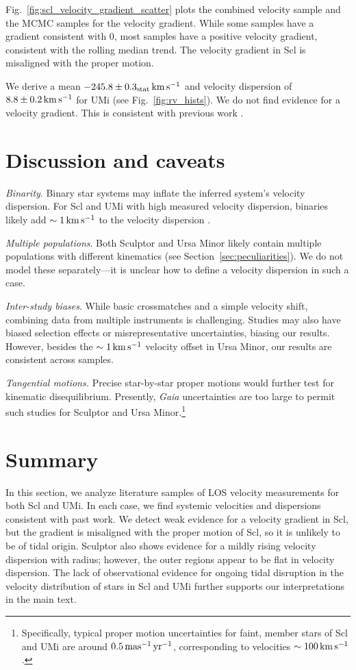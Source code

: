 Fig.~\ref{fig:scl_velocity_gradient_scatter} plots the combined velocity
sample and the MCMC samples for the velocity gradient. While some
samples have a gradient consistent with 0, most samples have a positive
velocity gradient, consistent with the rolling median trend. The
velocity gradient in Scl is misaligned with the proper motion.

We derive a mean \(-245.8\pm0.3_{\rm stat}\,{\rm km\,s^{-1}}\) and velocity
dispersion of \(8.8\pm0.2\,{\rm km\,s^{-1}}\) for UMi (see Fig.~\ref{fig:rv_hists}).
We do not find evidence for a velocity gradient. This is consistent with
previous work \citetext{\citealp{pace+2020}; \citealp[somewhat
with][]{spencer+2018}; \citealp{martinez-garcia+2023}}.

\section{Discussion and caveats}\label{discussion-and-caveats}

\emph{Binarity}. Binary star systems may inflate the inferred system's
velocity dispersion. For Scl and UMi with high measured velocity
dispersion, binaries likely add \(\sim 1\,{\rm km\,s^{-1}}\) to the velocity
dispersion \citep{spencer+2018, gration+2025}.

\emph{Multiple populations}. Both Sculptor and Ursa Minor likely contain
multiple populations with different kinematics (see
Section~\ref{sec:peculiarities}). We do not model these separately---it
is unclear how to define a velocity dispersion in such a case.

\emph{Inter-study biases}. While basic crossmatches and a simple
velocity shift, combining data from multiple instruments is challenging.
Studies may also have biased selection effects or misrepresentative
uncertainties, biasing our results. However, besides the \(\sim1\,{\rm km\,s^{-1}}\)
velocity offset in Ursa Minor, our results are consistent across
samples.

\emph{Tangential motions.} Precise star-by-star proper motions would
further test for kinematic disequilibrium. Presently, \emph{Gaia}
uncertainties are too large to permit such studies for Sculptor and Ursa
Minor.\footnote{Specifically, typical proper motion uncertainties for
  faint, member stars of Scl and UMi are around \(0.5\,{\rm mas^{-1}\,yr^{-1}}\),
  corresponding to velocities \(\sim 100\,{\rm km\,s^{-1}}\).}

\section{Summary}\label{summary}

In this section, we analyze literature samples of LOS velocity
measurements for both Scl and UMi. In each case, we find systemic
velocities and dispersions consistent with past work. We detect weak
evidence for a velocity gradient in Scl, but the gradient is misaligned
with the proper motion of Scl, so it is unlikely to be of tidal origin.
Sculptor also shows evidence for a mildly rising velocity dispersion
with radius; however, the outer regions appear to be flat in velocity
dispersion. The lack of observational evidence for ongoing tidal
disruption in the velocity distribution of stars in Scl and UMi further
supports our interpretations in the main text.
